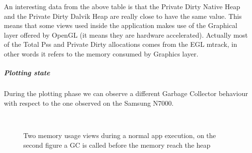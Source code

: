 An interesting data from the above table is that the Private Dirty Native Heap and the Private Dirty Dalvik Heap are really close to have the same value. This means that some views used inside the application makes use of the Graphical layer offered by OpenGL (it means they are hardware accelerated). Actually most of the Total Pss and Private Dirty allocations comes from the EGL mtrack, in other words it refers to the memory consumed by Graphics layer.
\subparagraph{Plotting state}
During the plotting phase we can observe a different Garbage Collector behaviour with respect to the one observed on the Samsung N7000.
\begin{figure}[!htb]
	\centering
	\\
	\caption{Two memory usage views during a normal app execution, on the second figure a GC is called before the memory reach the heap}  
	\label{fig22.15ab}
\end{figure}
